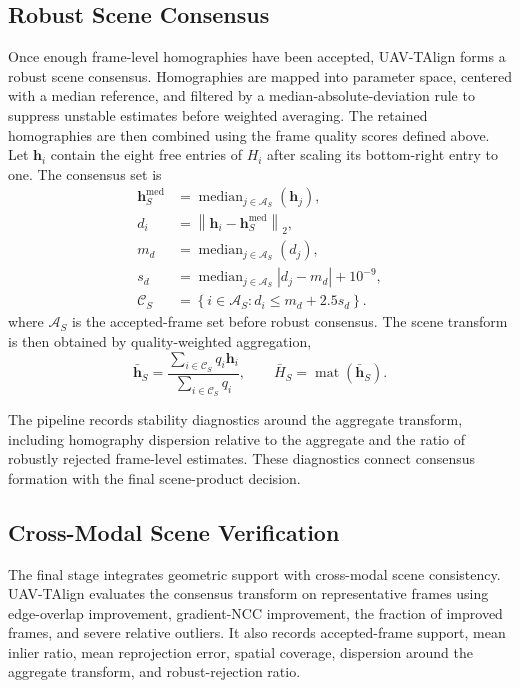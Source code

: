\subsection{Robust Scene Consensus}

Once enough frame-level homographies have been accepted, UAV-TAlign forms a robust scene consensus.
Homographies are mapped into parameter space, centered with a median reference, and filtered by a
median-absolute-deviation rule to suppress unstable estimates before weighted averaging. The
retained homographies are then combined using the frame quality scores defined above.
Let $\mathbf{h}_i$ contain the eight free entries of $H_i$ after scaling its bottom-right entry
to one. The consensus set is
\begin{equation}
\begin{aligned}
\mathbf{h}^{\mathrm{med}}_S
&= \operatorname{median}_{j \in \mathcal{A}_S}(\mathbf{h}_j), \\
d_i &= \left\|\mathbf{h}_i - \mathbf{h}^{\mathrm{med}}_S\right\|_2, \\
m_d &= \operatorname{median}_{j \in \mathcal{A}_S}(d_j), \\
s_d &= \operatorname{median}_{j \in \mathcal{A}_S}|d_j-m_d| + 10^{-9}, \\
\mathcal{C}_S &= \left\{i \in \mathcal{A}_S: d_i \le m_d + 2.5s_d\right\}.
\end{aligned}
\label{eq:consensus_set}
\end{equation}
where $\mathcal{A}_S$ is the accepted-frame set before robust consensus. The scene transform is
then obtained by quality-weighted aggregation,
\begin{equation}
\bar{\mathbf{h}}_S =
\frac{\sum_{i \in \mathcal{C}_S} q_i \mathbf{h}_i}
{\sum_{i \in \mathcal{C}_S} q_i},
\qquad
\bar{H}_S = \operatorname{mat}(\bar{\mathbf{h}}_S).
\label{eq:scene_consensus}
\end{equation}

The pipeline records stability diagnostics around the aggregate transform, including homography
dispersion relative to the aggregate and the ratio of robustly rejected frame-level estimates.
These diagnostics connect consensus formation with the final scene-product decision.

\subsection{Cross-Modal Scene Verification}

The final stage integrates geometric support with cross-modal scene consistency. UAV-TAlign
evaluates the consensus transform on representative frames using edge-overlap improvement,
gradient-NCC improvement, the fraction of improved frames, and severe relative outliers. It also
records accepted-frame support, mean inlier ratio, mean reprojection error, spatial coverage,
dispersion around the aggregate transform, and robust-rejection ratio.

